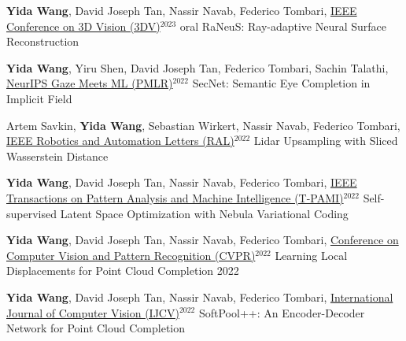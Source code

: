 


\begin{cventries}
\begin{enumerate}[label={[\arabic*]}, leftmargin=*]

\item 
\cvpublication
{\textbf{Yida Wang}, David Joseph Tan, Nassir Navab, Federico Tombari, \underline{IEEE Conference on 3D Vision (3DV)}$^{2023}$ oral} %
{RaNeuS: Ray-adaptive Neural Surface Reconstruction} %
{} %
{} %

\item 
\cvpublication
{\textbf{Yida Wang}, Yiru Shen, David Joseph Tan, Federico Tombari, Sachin Talathi, \underline{NeurIPS Gaze Meets ML (PMLR)}$^{2022}$} %
{SecNet: Semantic Eye Completion in Implicit Field} %
{} %
{} %

\item 
\cvpublication
{Artem Savkin, \textbf{Yida Wang}, Sebastian Wirkert, Nassir Navab, Federico Tombari, \underline{IEEE Robotics and Automation Letters (RAL)}$^{2022}$} %
{Lidar Upsampling with Sliced Wasserstein Distance} %
{} %
{} %

\item 
\cvpublication
{\textbf{Yida Wang}, David Joseph Tan, Nassir Navab, Federico Tombari, \underline{IEEE Transactions on Pattern Analysis and Machine Intelligence (T-PAMI)}$^{2022}$} %
{Self-supervised Latent Space Optimization with Nebula Variational Coding} %
{} %
{} %

\item 
\cvpublication
{\textbf{Yida Wang}, David Joseph Tan, Nassir Navab, Federico Tombari, \underline{Conference on Computer Vision and Pattern Recognition (CVPR)}$^{2022}$} 
{Learning Local Displacements for Point Cloud Completion} %
{2022} %
{} %
{} %

\item 
\cvpublication
{\textbf{Yida Wang}, David Joseph Tan, Nassir Navab, Federico Tombari, \underline{International Journal of Computer Vision (IJCV)}$^{2022}$} %
{SoftPool++: An Encoder-Decoder Network for Point Cloud Completion} %
{} %
{} %


\end{enumerate}
\end{cventries}
